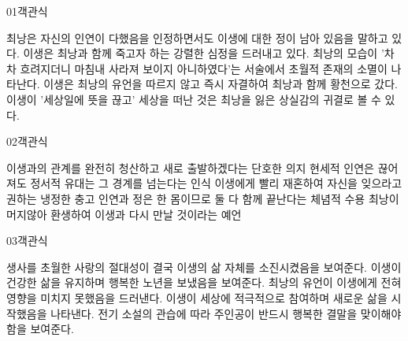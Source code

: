 \documentclass[fs85,seriesWit]{korfarm-base}
\begin{document}
\kfBeginMC
\begin{kfQBlock}{01}{객관식}
\begin{kfChoices}
\kfChoice 최낭은 자신의 인연이 다했음을 인정하면서도 이생에 대한 정이 남아 있음을 말하고 있다.
\kfChoice 이생은 최낭과 함께 죽고자 하는 강렬한 심정을 드러내고 있다.
\kfChoice 최낭의 모습이 '차차 흐려지더니 마침내 사라져 보이지 아니하였다'는 서술에서 초월적 존재의 소멸이 나타난다.
\kfChoice 이생은 최낭의 유언을 따르지 않고 즉시 자결하여 최낭과 함께 황천으로 갔다.
\kfChoice 이생이 '세상일에 뜻을 끊고' 세상을 떠난 것은 최낭을 잃은 상실감의 귀결로 볼 수 있다.
\end{kfChoices}
\end{kfQBlock}

\begin{kfQBlock}{02}{객관식}
\begin{kfChoices}
\kfChoice 이생과의 관계를 완전히 청산하고 새로 출발하겠다는 단호한 의지
\kfChoice 현세적 인연은 끊어져도 정서적 유대는 그 경계를 넘는다는 인식
\kfChoice 이생에게 빨리 재혼하여 자신을 잊으라고 권하는 냉정한 충고
\kfChoice 인연과 정은 한 몸이므로 둘 다 함께 끝난다는 체념적 수용
\kfChoice 최낭이 머지않아 환생하여 이생과 다시 만날 것이라는 예언
\end{kfChoices}
\end{kfQBlock}

\begin{kfQBlock}{03}{객관식}
\begin{kfChoices}
\kfChoice 생사를 초월한 사랑의 절대성이 결국 이생의 삶 자체를 소진시켰음을 보여준다.
\kfChoice 이생이 건강한 삶을 유지하며 행복한 노년을 보냈음을 보여준다.
\kfChoice 최낭의 유언이 이생에게 전혀 영향을 미치지 못했음을 드러낸다.
\kfChoice 이생이 세상에 적극적으로 참여하며 새로운 삶을 시작했음을 나타낸다.
\kfChoice 전기 소설의 관습에 따라 주인공이 반드시 행복한 결말을 맞이해야 함을 보여준다.
\end{kfChoices}
\end{kfQBlock}
\end{document}
